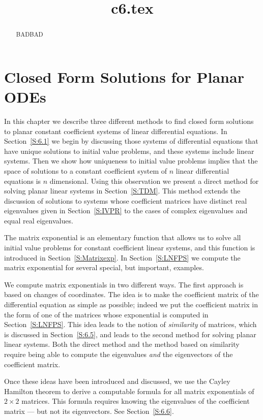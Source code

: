 \documentclass{ximera}
\title{c6.tex}
\begin{document}
\begin{abstract}
BADBAD
\end{abstract}
\maketitle

\chapter{Closed Form Solutions for Planar ODEs}
\label{Chap:Planar}

\normalsize

In this chapter we describe three different methods to find closed form
solutions to planar constant coefficient systems of linear differential
equations.  In Section~\ref{S:6.1} we begin by discussing those systems of
differential equations that have unique solutions to initial value problems,
and these systems include linear systems.  Then we show how uniqueness to
initial value problems implies that the space of solutions to a constant
coefficient system of $n$ linear differential equations is $n$ dimensional.
Using this observation we present a direct method for solving planar linear
systems in Section~\ref{S:TDM}.  This method extends the discussion of
solutions to systems whose coefficient matrices have distinct real
eigenvalues given in Section~\ref{S:IVPR} to the cases of complex
eigenvalues and equal real eigenvalues.

The matrix exponential is an elementary function that allows us to solve
all initial value problems for constant coefficient linear systems, and
this function is introduced in Section~\ref{S:Matrixexp}.  In
Section~\ref{S:LNFPS} we compute the matrix exponential for several
special, but important, examples.

We compute matrix exponentials in two different ways.  The first approach is
based on changes of coordinates.  The idea is to make the coefficient matrix
of the differential equation as simple as possible; indeed we put the
coefficient matrix in the form of one of the matrices whose exponential is
computed in Section~\ref{S:LNFPS}.  This idea leads to the notion of
{\em similarity\/} of matrices, which is discussed in Section~\ref{S:6.5}, and
leads to the second method for solving planar linear systems. Both the direct
method and the method based on similarity require being able to compute the
eigenvalues {\em and\/} the eigenvectors of the coefficient matrix.

Once these ideas have been introduced and discussed, we use the
Cayley Hamilton theorem to derive a computable formula for all matrix
exponentials of $2\times 2$ matrices.  This formula requires knowing
the eigenvalues of the coefficient matrix --- but not its eigenvectors.
See Section~\ref{S:6.6}.
\end{document}
